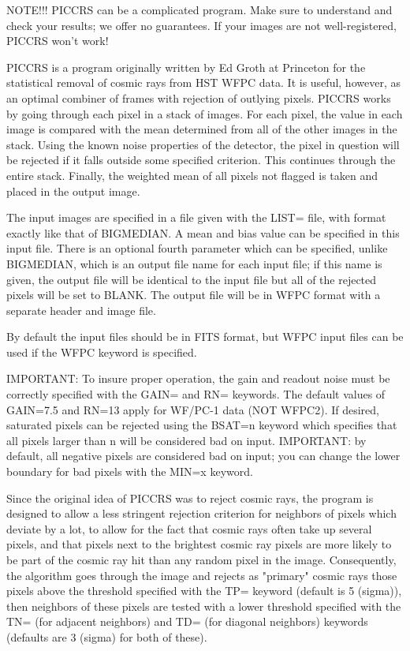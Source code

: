 NOTE!!! PICCRS can be a complicated program. Make sure to understand and
check your results; we offer no guarantees. If your images are not
well-registered, PICCRS won't work!

PICCRS is a program originally written by Ed Groth at Princeton for the
statistical removal of cosmic rays from HST WFPC data. It is useful,
however, as an optimal combiner of frames with rejection of outlying
pixels.  PICCRS works by going through each pixel in a stack of images.
For each pixel, the value in each image is compared with the mean
determined from all of the other images in the stack. Using the known noise
properties of the detector, the pixel in question will be rejected if it
falls outside some specified criterion. This continues through the entire
stack. Finally, the weighted mean of all pixels not flagged is taken and
placed in the output image.

The input images are specified in a file given with the LIST= file, with
format exactly like that of BIGMEDIAN. A mean and bias value can be
specified in this input file. There is an optional fourth parameter which
can be specified, unlike BIGMEDIAN, which is an output file name for each
input file; if this name is given, the output file will be identical to the
input file but all of the rejected pixels will be set to BLANK. The output
file will be in WFPC format with a separate header and image file.

By default the input files should be in FITS format, but WFPC input files
can be used if the WFPC keyword is specified.

IMPORTANT: To insure proper operation, the gain and readout noise must be
correctly specified with the GAIN= and RN= keywords. The default values of
GAIN=7.5 and RN=13 apply for WF/PC-1 data (NOT WFPC2). If desired,
saturated pixels can be rejected using the BSAT=n keyword which specifies
that all pixels larger than n will be considered bad on input. IMPORTANT:
by default, all negative pixels are considered bad on input; you can change
the lower boundary for bad pixels with the MIN=x keyword.

Since the original idea of PICCRS was to reject cosmic rays, the program is
designed to allow a less stringent rejection criterion for neighbors of
pixels which deviate by a lot, to allow for the fact that cosmic rays often
take up several pixels, and that pixels next to the brightest cosmic ray
pixels are more likely to be part of the cosmic ray hit than any random
pixel in the image.  Consequently, the algorithm goes through the image and
rejects as "primary" cosmic rays those pixels above the threshold specified
with the TP= keyword (default is 5 (sigma)), then neighbors of these pixels
are tested with a lower threshold specified with the TN= (for adjacent
neighbors) and TD= (for diagonal neighbors) keywords (defaults are 3
(sigma) for both of these).

